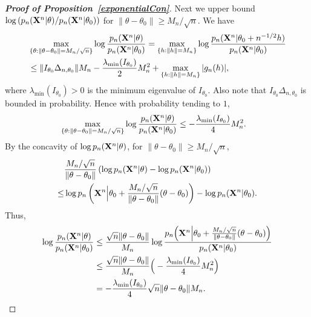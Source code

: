 \documentclass[11pt]{article}
\theoremstyle{plain}
\theoremstyle{definition}
\theoremstyle{remark}
\begin{document}
\begin{appendices}
\begin{proof}[\textbf{Proof of Proposition~\ref{exponentialCon}}]
Next we upper bound $\log \left(p_n(\mathbf{X}^{n}|\theta)/p_n(\mathbf{X}^{n}|\theta_0)\right)$ for $\|\theta-\theta_0\|\geq M_n/\sqrt{n}$.
    We have
    $$
    \begin{aligned}
        &\max_{\{\theta:\|\theta-\theta_0\|=M_n/\sqrt{n}\}}
    \log\frac{p_n(\mathbf{X}^{n}|\theta)}{p_n(\mathbf{X}^{n}|\theta_0)}
    =
    \max_{\{h:\|h\|=M_n\}}
    \log\frac{p_n(\mathbf{X}^{n}|\theta_0+n^{-1/2}h)}{p_n(\mathbf{X}^{n}|\theta_0)}
        \\
        &\leq
         \|I_{\theta_0}\Delta_{n,\theta_0}\| M_n -\frac{\lambda_{\min}(I_{\theta_0})}{2} M_n^2+
        \max_{\{h:\|h\|=M_n\}}|g_n(h)|,
    \end{aligned}
    $$
    where $\lambda_{\min}(I_{\theta_0})>0$ is the minimum eigenvalue of $I_{\theta_0}$.
    Also note that $I_{\theta_0}\Delta_{n,\theta_0}$ is bounded in probability. Hence with probability tending to $1$,
    $$
    \begin{aligned}
        &\max_{\{\theta:\|\theta-\theta_0\|=M_n/\sqrt{n}\}}
    \log\frac{p_n(\mathbf{X}^{n}|\theta)}{p_n(\mathbf{X}^{n}|\theta_0)}
        \leq 
        -\frac{\lambda_{\min}(I_{\theta_0})}{4}M_n^2.
    \end{aligned} 
    $$
    By the concavity of $\log p_n(\mathbf{X}^{n}|\theta)$, for $\|\theta-\theta_0\|\geq M_n/\sqrt{n}$,
    \begin{equation*}
        \begin{split}
     &\frac{M_n/\sqrt{n}}{\|\theta-\theta_0\|}
     \left(
     \log p_n(\mathbf{X}^{n}|\theta)-\log p_n(\mathbf{X}^{n}|\theta_0)
     \right)
     \\
     \leq&
     \log p_n \left(\mathbf{X}^{n}\Big|\theta_0+\frac{M_n/\sqrt{n}}{\|\theta-\theta_0\|}(\theta-\theta_0)\right)-\log p_n(\mathbf{X}^{n}|\theta_0).
        \end{split}
    \end{equation*}
    Thus,
    $$
    \begin{aligned}
     \log \frac{p_n(\mathbf{X}^{n}|\theta)}{ p_n(\mathbf{X}^{n}|\theta_0)}
        &\leq
        \frac{\sqrt{n}\|\theta-\theta_0\|}{M_n}
     \log \frac{p_n\Big(\mathbf{X}^{n}\Big|\theta_0+\frac{M_n/\sqrt{n}}{\|\theta-\theta_0\|}(\theta-\theta_0)\Big)}{ p_n(\mathbf{X}^{n}|\theta_0)}
        \\
        &\leq
        \frac{\sqrt{n}\|\theta-\theta_0\|}{M_n}
        \Big(-\frac{\lambda_{\min}(I_{\theta_0})}{4}M_n^2\Big)
        \\
        &=
        -\frac{\lambda_{\min}(I_{\theta_0})}{4}\sqrt{n}\|\theta-\theta_0\|
        M_n.
    \end{aligned}
    $$

\end{proof}
\end{appendices}
\end{document}
